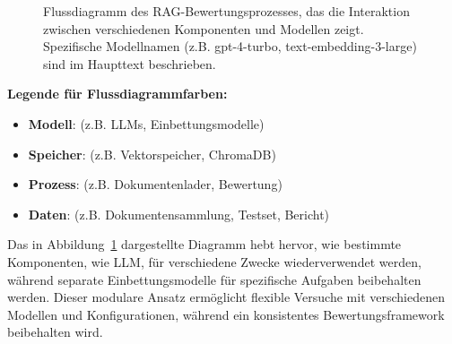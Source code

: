 \begin{figure}[!ht]
{
    }
    \caption[Flussdiagramm des RAG-Bewertungsprozesses]{Flussdiagramm des RAG-Bewertungsprozesses, das die Interaktion zwischen verschiedenen Komponenten und Modellen zeigt. Spezifische Modellnamen (z.B. gpt-4-turbo, text-embedding-3-large) sind im Haupttext beschrieben.}
    \label{fig:rag-flow}
\end{figure}

\begin{center}
\begin{minipage}{0.85\textwidth}
\textbf{Legende für Flussdiagrammfarben:}
\begin{itemize}
    \item \colorbox{pink!20}{\strut\hspace{1.5em}} \textbf{Modell}: (z.B. LLMs, Einbettungsmodelle)
    \item \colorbox{blue!20}{\strut\hspace{1.5em}} \textbf{Speicher}: (z.B. Vektorspeicher, ChromaDB)
    \item \colorbox{green!20}{\strut\hspace{1.5em}} \textbf{Prozess}: (z.B. Dokumentenlader, Bewertung)
    \item \colorbox{red!20}{\strut\hspace{1.5em}} \textbf{Daten}: (z.B. Dokumentensammlung, Testset, Bericht)
\end{itemize}
\end{minipage}
\end{center}

Das in Abbildung~\ref{fig:rag-flow} dargestellte Diagramm hebt hervor, wie bestimmte Komponenten, wie LLM, für verschiedene Zwecke wiederverwendet werden, während separate Einbettungsmodelle für spezifische Aufgaben beibehalten werden. Dieser modulare Ansatz ermöglicht flexible Versuche mit verschiedenen Modellen und Konfigurationen, während ein konsistentes Bewertungsframework beibehalten wird.